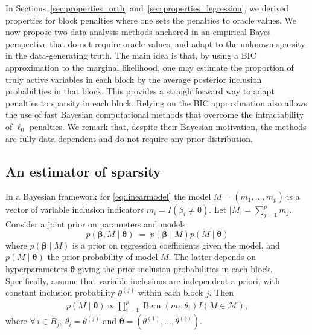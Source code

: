 \documentclass[bj,authoryear]{imsart}
\theoremstyle{plain}
\newcommand{\M}{\mathcal{M}}
\newcommand{\bs}{\boldsymbol}
\begin{document}
In Sections~\ref{sec:properties_orth} and~\ref{sec:properties_legression}, we derived properties for block penalties where one sets the penalties to oracle values.
We now
propose two data analysis methods anchored in an empirical Bayes perspective
that do not require oracle values, and adapt to the unknown sparsity in the data-generating truth.
The main idea is that, by using a BIC approximation to the marginal likelihood, one may estimate the proportion of truly active variables in each block by the average posterior inclusion probabilities in that block. This provides
a straightforward way to adapt penalties to sparsity in each block. Relying on the BIC approximation also allows the use of fast Bayesian computational methods that overcome the intractability of $\ell_0$ penalties. 
We remark that, despite their Bayesian motivation, the methods are fully data-dependent and do not require any prior distribution.

\subsection{An estimator of sparsity}\label{ssec:est.sparsity}

In a Bayesian framework for \eqref{eq:linearmodel} the model $M=(m_1,\ldots,m_p)$ is a vector of variable inclusion indicators $m_i=I(\beta_i \neq 0)$. Let $|M|=\sum_{j=1}^p m_j$. Consider a joint prior on parameters and models 
\begin{equation}\label{eq:bayesianframework}
    p(\boldsymbol{\beta},M \mid \boldsymbol{\theta})\;=\;p( \boldsymbol{\beta} \mid  M) p(M \mid \boldsymbol{\theta})
\end{equation}
where $p( \boldsymbol{\beta} \mid  M)$ is a prior on regression coefficients given the model, and 
$p(M \mid \boldsymbol{\theta})$ the prior probability of model $M$. The latter depends on hyperparameters $\bs \theta$ giving the prior inclusion probabilities in each block.
Specifically, assume that variable inclusions are independent a priori,
with constant inclusion probability $\theta^{(j)}$ within each block $j$. Then
\begin{eqnarray} \label{eq:block_modelprior}
p( M \mid \boldsymbol{\theta}) \propto
        \prod_{i=1}^p \operatorname{Bern}\left(m_i ; \theta_i\right) I(M \in \M),
\end{eqnarray}
where $\forall \, i\in B_j, \: \theta_i=\theta^{(j)}$ and $\bs \theta=(\theta^{(1)},\ldots,\theta^{(b)})$.
\end{document}
